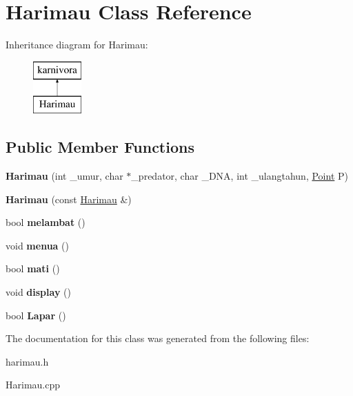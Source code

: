 \hypertarget{class_harimau}{}\section{Harimau Class Reference}
\label{class_harimau}
Inheritance diagram for Harimau\+:\begin{figure}[H]
\begin{center}
\leavevmode
\includegraphics[height=2.000000cm]{class_harimau}
\end{center}
\end{figure}
\subsection*{Public Member Functions}
\begin{DoxyCompactItemize}
\item 
{\bfseries Harimau} (int \+\_\+umur, char $\ast$\+\_\+predator, char \+\_\+\+D\+NA, int \+\_\+ulangtahun, \hyperlink{class_point}{Point} P)\hypertarget{class_harimau_a74986483c77906e31e76bf60afbec4c4}{}\label{class_harimau_a74986483c77906e31e76bf60afbec4c4}

\item 
{\bfseries Harimau} (const \hyperlink{class_harimau}{Harimau} \&)\hypertarget{class_harimau_a0c9d5174a7f6b6bfaa3e7b5c009b32dc}{}\label{class_harimau_a0c9d5174a7f6b6bfaa3e7b5c009b32dc}

\item 
bool {\bfseries melambat} ()\hypertarget{class_harimau_a5e2949d520df0978cecab066a1d300f6}{}\label{class_harimau_a5e2949d520df0978cecab066a1d300f6}

\item 
void {\bfseries menua} ()\hypertarget{class_harimau_a1d0276008f536b10cb045530104fdcf7}{}\label{class_harimau_a1d0276008f536b10cb045530104fdcf7}

\item 
bool {\bfseries mati} ()\hypertarget{class_harimau_a4d141f08a5514ff45493efcd4fdb902d}{}\label{class_harimau_a4d141f08a5514ff45493efcd4fdb902d}

\item 
void {\bfseries display} ()\hypertarget{class_harimau_a63e4b1698384423df35b90159c84305c}{}\label{class_harimau_a63e4b1698384423df35b90159c84305c}

\item 
bool {\bfseries Lapar} ()\hypertarget{class_harimau_aa2ab17279c6f573cc08ff374f3418c4f}{}\label{class_harimau_aa2ab17279c6f573cc08ff374f3418c4f}

\end{DoxyCompactItemize}


The documentation for this class was generated from the following files\+:\begin{DoxyCompactItemize}
\item 
harimau.\+h\item 
Harimau.\+cpp\end{DoxyCompactItemize}
